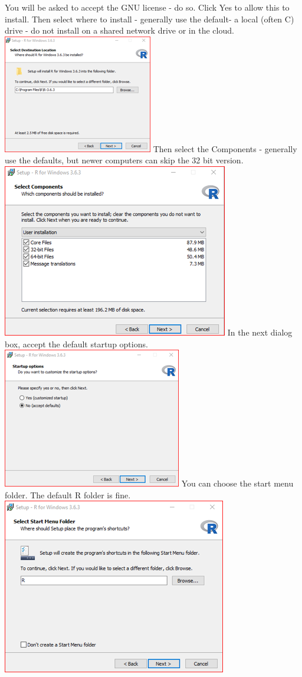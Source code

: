 \documentclass[
]{book}
\begin{document}
You will be asked to accept the GNU license - do so. Click Yes to allow this to install. Then select where to install - generally use the default- a local (often C) drive - do not install on a shared network drive or in the cloud.
\includegraphics{images/installrdrive.png}
Then select the Components - generally use the defaults, but newer computers can skip the 32 bit version.
\includegraphics{images/installrComponents.png}
In the next dialog box, accept the default startup options.
\includegraphics{images/installrdefaults.png}
You can choose the start menu folder. The default R folder is fine.
\includegraphics{images/installrstartmenu.png}
\end{document}
